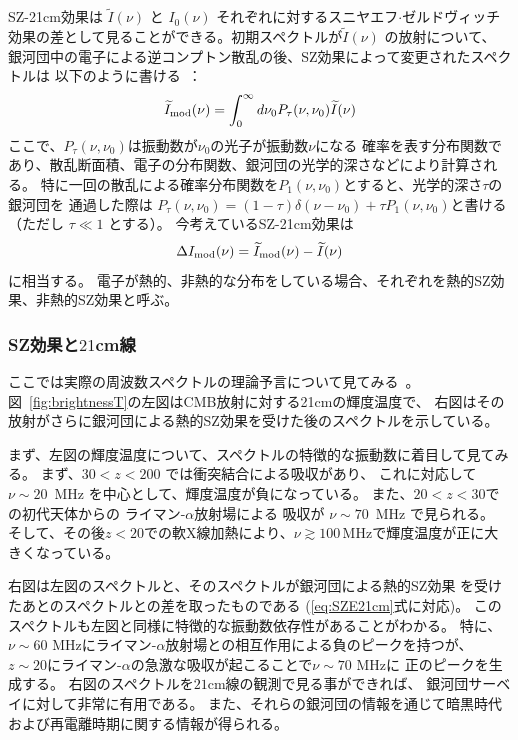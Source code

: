 SZ-21cm効果は $\widetilde{I} (\nu)$ と $I_0 (\nu)$ それぞれに対するスニヤエフ$\cdot$ゼルドヴィッチ
効果の差として見ることができる。初期スペクトルが$\widetilde{I}(\nu) $ の放射について、
銀河団中の電子による逆コンプトン散乱の後、SZ効果によって変更されたスペクトルは
以下のように書ける~\citep{Cooray:2005bc}：
\begin{equation}
\widetilde{I}_{\rm mod} (\nu) = \int_0^{\infty} d \nu_0 P_\tau (\nu, \nu_0) \widetilde{I} (\nu) 
\end{equation}
ここで、$P_\tau (\nu, \nu_0)$は振動数が$\nu_0$の光子が振動数$\nu$になる
確率を表す分布関数であり、散乱断面積、電子の分布関数、銀河団の光学的深さなどにより計算される。
特に一回の散乱による確率分布関数を$P_1(\nu, \nu_0)$とすると、光学的深さ$\tau$の銀河団を
通過した際は $P_\tau (\nu, \nu_0) = (1-\tau) \delta (\nu - \nu_0) + \tau P_1 (\nu, \nu_0)$と書ける
（ただし $\tau \ll 1$ とする）。
今考えているSZ-21cm効果は
\begin{equation}
\label{eq:SZE21cm}
\Delta I_{\rm mod} (\nu) = \widetilde{I}_{\rm mod} (\nu) - \widetilde{I} (\nu)
\end{equation}
に相当する。
電子が熱的、非熱的な分布をしている場合、それぞれを熱的SZ効果、非熱的SZ効果と呼ぶ。

\subsubsection{SZ効果と$21$cm線}

ここでは実際の周波数スペクトルの理論予言について見てみる~\citep{Colafrancesco2014,Cooray:2005bc}。
図~\ref{fig:brightnessT}の左図はCMB放射に対する21cmの輝度温度で、
右図はその放射がさらに銀河団による熱的SZ効果を受けた後のスペクトルを示している。

まず、左図の輝度温度について、スペクトルの特徴的な振動数に着目して見てみる。
まず、$ 30 < z <200$ では衝突結合による吸収があり、
これに対応して$\nu \sim 20$~MHz を中心として、輝度温度が負になっている。
また、$ 20 <z <30$での初代天体からの ライマン-$\alpha$放射場による
吸収が $\nu\sim 70$~MHz で見られる。
そして、その後$z<20$での軟X線加熱により、$\nu\gtrsim 100\,$MHzで輝度温度が正に大きくなっている。

右図は左図のスペクトルと、そのスペクトルが銀河団による熱的SZ効果
を受けたあとのスペクトルとの差を取ったものである (\eqref{eq:SZE21cm}式に対応)。
このスペクトルも左図と同様に特徴的な振動数依存性があることがわかる。
特に、$\nu\sim 60$ MHzにライマン-$\alpha$放射場との相互作用による負のピークを持つが、
$z\sim 20$にライマン-$\alpha$の急激な吸収が起こることで$\nu\sim 70$ MHzに
正のピークを生成する。
右図のスペクトルを$21$cm線の観測で見る事ができれば、
銀河団サーベイに対して非常に有用である。
また、それらの銀河団の情報を通じて暗黒時代および再電離時期に関する情報が得られる。

